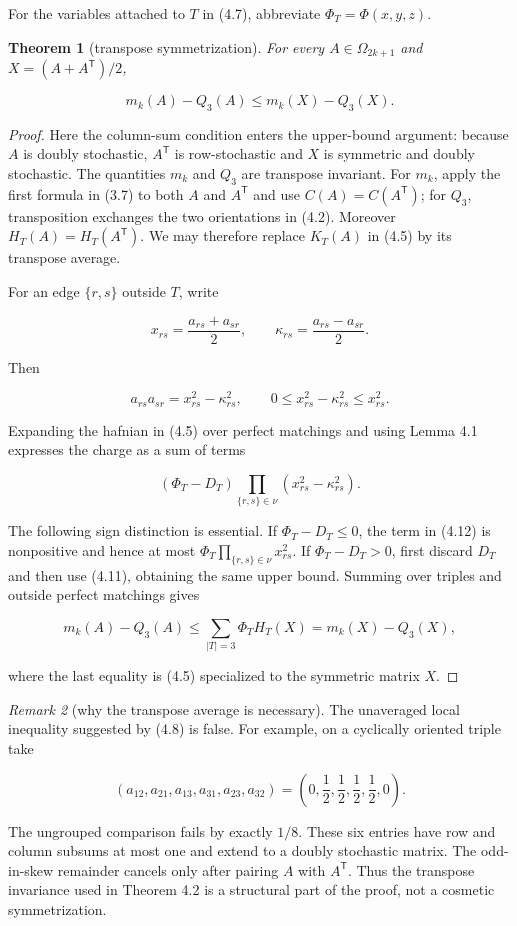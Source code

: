 \documentclass[11pt]{article}
\newtheorem{theorem}{Theorem}[section]
\theoremstyle{remark}
\newtheorem{remark}[theorem]{Remark}
\begin{document}
For the variables attached to $T$ in (4.7), abbreviate
$\Phi_T=\Phi(x,y,z)$.

\begin{theorem}[transpose symmetrization]
For every
$A\in\Omega_{2k+1}$ and $X=(A+A^{\mathsf T})/2$,

\[
m_k(A)-Q_3(A)\le m_k(X)-Q_3(X).
\tag{4.10}
\]

\end{theorem}

\begin{proof}
Here the column-sum condition enters the upper-bound argument:
because $A$ is doubly stochastic, $A^{\mathsf T}$ is row-stochastic and
$X$ is symmetric and doubly stochastic. The quantities $m_k$ and $Q_3$ are
transpose invariant. For $m_k$, apply the first formula in (3.7) to both
$A$ and $A^{\mathsf T}$ and use $C(A)=C(A^{\mathsf T})$; for $Q_3$,
transposition exchanges the two orientations in (4.2). Moreover
$H_T(A)=H_T(A^{\mathsf T})$. We may therefore replace $K_T(A)$ in (4.5)
by its transpose average.

For an edge $\{r,s\}$ outside $T$, write

\[
x_{rs}=\frac{a_{rs}+a_{sr}}2,
\qquad
\kappa_{rs}=\frac{a_{rs}-a_{sr}}2.
\]

Then

\[
a_{rs}a_{sr}=x_{rs}^2-\kappa_{rs}^2,
\qquad
0\le x_{rs}^2-\kappa_{rs}^2\le x_{rs}^2.
\tag{4.11}
\]

Expanding the hafnian in (4.5) over perfect matchings and using Lemma 4.1
expresses the charge as a sum of terms

\[
(\Phi_T-D_T)
\prod_{\{r,s\}\in\nu}(x_{rs}^2-\kappa_{rs}^2).
\tag{4.12}
\]

The following sign distinction is essential. If $\Phi_T-D_T\le0$, the term
in (4.12) is nonpositive and hence at most
$\Phi_T\prod_{\{r,s\}\in\nu}x_{rs}^2$. If $\Phi_T-D_T>0$, first discard
$D_T$ and then use (4.11), obtaining the same upper bound. Summing over
triples and outside perfect matchings gives

\[
m_k(A)-Q_3(A)
\le\sum_{|T|=3}\Phi_T H_T(X)
=m_k(X)-Q_3(X),
\]

where the last equality is (4.5) specialized to the symmetric matrix $X$.
\end{proof}

\begin{remark}[why the transpose average is necessary]
The unaveraged
local inequality suggested by (4.8) is false. For example, on a cyclically
oriented triple take

\[
(a_{12},a_{21},a_{13},a_{31},a_{23},a_{32})
=\left(0,\frac12,\frac12,\frac12,\frac12,0\right).
\tag{4.13}
\]

The ungrouped comparison fails by exactly $1/8$. These six entries have row
and column subsums at most one and extend to a doubly stochastic matrix.
The odd-in-skew remainder cancels only after pairing $A$ with
$A^{\mathsf T}$. Thus the transpose invariance used in Theorem 4.2 is a
structural part of the proof, not a cosmetic symmetrization.

\end{remark}
\end{document}
